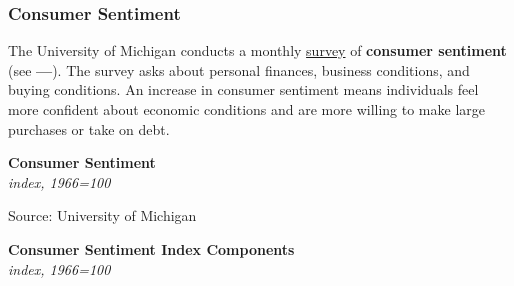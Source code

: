 \documentclass{report}
\makeatletter
\newcommand{\tbllink}[1]{\href{https://raw.githubusercontent.com/bdecon/US-chartbook/master/chartbook/data/#1}{\faTable}}
\newcommand*\short[1]{\expandafter\@gobbletwo\number\numexpr#1\relax}
\newcommand{\dateaxisticks}{
		date coordinates in=x, axis line style={draw=none},
		xmax={2023-11-01},
		max space between ticks=40,	    
		xtick={{1990-01-01}, {1992-01-01}, {1994-01-01}, 
			{1996-01-01}, {1998-01-01}, {2000-01-01}, 
			{2002-01-01}, {2004-01-01}, {2006-01-01},
			{2008-01-01}, {2010-01-01}, {2012-01-01}, {2014-01-01},
		    {2016-01-01}, {2018-01-01}, {2020-01-01}, {2022-01-01}, 
		    {2024-01-01}, {2026-01-01}},
		minor xtick={{1989-01-01}, {1991-01-01}, {1993-01-01},
			{1995-01-01}, {1997-01-01}, {1999-01-01}, 
			{2001-01-01}, {2003-01-01}, {2005-01-01}, {2007-01-01},
		    {2009-01-01}, {2011-01-01}, {2013-01-01}, {2015-01-01},
		    {2017-01-01}, {2019-01-01}, {2021-01-01}, {2023-01-01}, 
		    {2025-01-01}, {2027-01-01}},
		enlarge y limits={0.06}, enlarge x limits={0.01},
		}
\newcommand{\bbar}[2]{extra #1 ticks = {{#2}}, extra #1 tick labels = ,
		extra #1 tick style = {grid=major, grid style={thick, black!25}},}
\newcommand{\stdline}[4]{\addplot[very thick, no markers, color=#1] 
		table [x=#2, y=#3, col sep=comma] {#4};	}
\newcommand{\rbars}{
		\fill[color=black!10] (axis cs:{1990-07-01},\pgfkeysvalueof{/pgfplots/ymin}) rectangle 
			(axis cs:{1991-03-01}, \pgfkeysvalueof{/pgfplots/ymax});
		\fill[color=black!10] (axis cs:{2007-12-01},\pgfkeysvalueof{/pgfplots/ymin}) rectangle 
			(axis cs:{2009-07-01}, \pgfkeysvalueof{/pgfplots/ymax});
		\fill[color=black!10] (axis cs:{2001-03-01},\pgfkeysvalueof{/pgfplots/ymin}) rectangle 
			(axis cs:{2001-11-01}, \pgfkeysvalueof{/pgfplots/ymax});
		\fill[color=black!10] (axis cs:{2020-02-01},\pgfkeysvalueof{/pgfplots/ymin}) rectangle 
			(axis cs:{2020-05-01}, \pgfkeysvalueof{/pgfplots/ymax});}
\makeatother
\begin{document}
{\begin{minipage}{0.76\textwidth}
\subsubsection*{Consumer Sentiment} 
\small The University of Michigan conducts a monthly \href{http://www.sca.isr.umich.edu/}{survey} of \textbf{consumer sentiment} (see {\color{violet!60!blue}\textbf{---}}). The survey asks about personal finances, business conditions, and buying conditions. An increase in consumer sentiment means individuals feel more confident about economic conditions and are more willing to make large purchases or take on debt. 


\vspace{0.5mm}

\normalsize \textbf{Consumer Sentiment}\\
\footnotesize{\textit{index, 1966=100}}
\vspace{3.3cm}

\hspace{3mm} 

\footnotesize{Source: University of Michigan} \hfill \tbllink{umichsoc.csv}
\vspace{3mm}

\small 
\vspace{0.5mm}

\normalsize \textbf{Consumer Sentiment Index Components}\\
\footnotesize{\textit{index, 1966=100}}
\vspace*{-1.5mm}


\end{minipage}}
\end{document}
